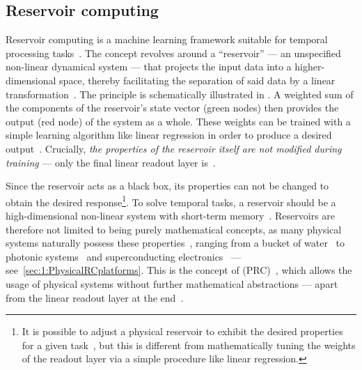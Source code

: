\subsection{Reservoir computing}
Reservoir computing is a machine learning framework suitable for temporal processing tasks~\cite{BookReservoirComputing}.
The concept revolves around a ``reservoir'' --- an unspecified non-linear dynamical system --- that projects the input data into a higher-dimensional space, thereby facilitating the separation of said data by a linear transformation~\cite{appeltant2011information,KUR-24,RC_ASI}. %
The principle is schematically illustrated in .
A weighted sum of the components of the reservoir's state vector (green nodes) then provides the output (red node) of the system as a whole. %
These weights can be trained with a simple learning algorithm like linear regression in order to produce a desired output~\cite{RC_RecentAdvances, RC_SuperconductingElectronics}.
Crucially, \textit{the properties of the reservoir itself are not modified during training} --- only the final linear readout layer is~\cite{RC_ASI,DynamicEmergence_NanomagneticSystem}. \par
Since the reservoir acts as a black box, its properties can not be changed to obtain the desired response\footnote{
	It is possible to adjust a physical reservoir to exhibit the desired properties for a given task~\cite{AdaptiveProgrammableRC,gartside2022reconfigurable}, but this is different from mathematically tuning the weights of the readout layer via a simple procedure like linear regression.
}.
To solve temporal tasks, a reservoir should be a high-dimensional non-linear system with short-term memory~\cite{NeuromorphicAFMspintronics,RC_RecentAdvances}.
Reservoirs are therefore not limited to being purely mathematical concepts, as many physical systems naturally possess these properties~\cite{RC_DipoleNanomagnets,RC_PassiveFrustratedNM,RC_ASI,RC_RecentAdvances,NeuromorphicOscillators,VowelRecognition4STO,RC_DiffusiveMemristors,RC_MemristorTemporal,gartside2022reconfigurable}, ranging from a bucket of water~\cite{PatternRecognition_Bucket} to photonic systems~\cite{RC_Photonic} and superconducting electronics~\cite{RC_SuperconductingElectronics} --- see~\cref{sec:1:PhysicalRCplatforms}.
This is the concept of  (PRC)~\cite{PRC}, which allows the usage of physical systems without further mathematical abstractions --- apart from the linear readout layer at the end~\cite{RC_RecentAdvances}. \par
